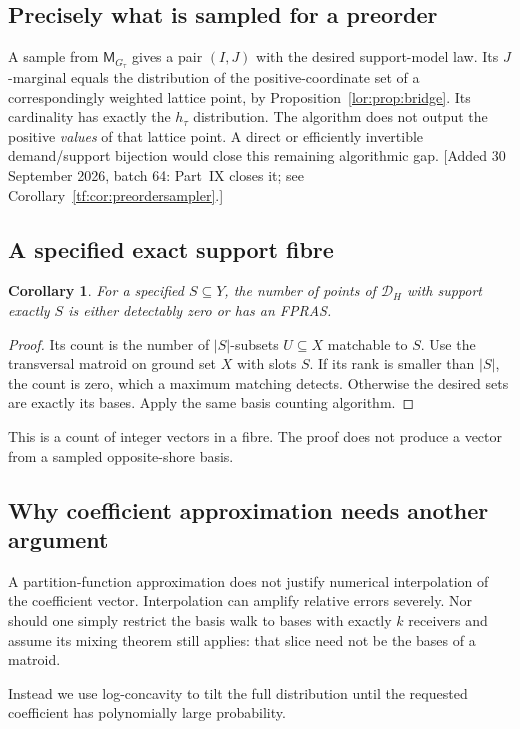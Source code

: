 \documentclass[11pt]{article}
\numberwithin{equation}{section}
\newtheorem{corollary}[theorem]{Corollary}
\theoremstyle{definition}
\newcommand{\cD}{\mathcal D}
\begin{document}
\subsection{Precisely what is sampled for a preorder}
A sample from $\mathsf M_{G_\tau}$ gives a pair $(I,J)$ with the desired support-model
law. Its $J$-marginal equals the distribution of the positive-coordinate set
of a correspondingly weighted lattice point, by Proposition~\ref{lor:prop:bridge}. Its
cardinality has exactly the $h_\tau$ distribution. The algorithm does not
output the positive \emph{values} of that lattice point. A direct or efficiently
invertible demand/support bijection would close this remaining algorithmic gap.
[Added 30 September 2026, batch 64: Part~IX closes it; see
Corollary~\ref{tf:cor:preordersampler}.]

\subsection{A specified exact support fibre}
\begin{corollary}\label{lor:cor:fibreFPRAS}
For a specified $S\subseteq Y$, the number of points of $\cD_H$ with
support exactly $S$ is either detectably zero or has an FPRAS.
\end{corollary}
\begin{proof}
Its count is the number of $|S|$-subsets $U\subseteq X$ matchable to $S$.
Use the transversal matroid on ground set $X$ with slots $S$. If its rank
is smaller than $|S|$, the count is zero, which a maximum matching detects.
Otherwise the desired sets are exactly its bases. Apply the same basis
counting algorithm.
\end{proof}
This is a count of integer vectors in a fibre. The proof does not produce
a vector from a sampled opposite-shore basis.

\subsection{Why coefficient approximation needs another argument}
A partition-function approximation does not justify numerical interpolation
of the coefficient vector. Interpolation can amplify relative errors
severely. Nor should one simply restrict the basis walk to bases with
exactly $k$ receivers and assume its mixing theorem still applies: that
slice need not be the bases of a matroid.

Instead we use log-concavity to tilt the full distribution until the
requested coefficient has polynomially large probability.
\end{document}
